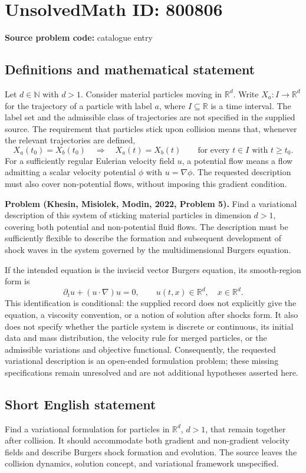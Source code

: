 \documentclass[11pt]{article}
\newcommand{\N}{\mathbb{N}}
\newcommand{\R}{\mathbb{R}}
\begin{document}
\section*{UnsolvedMath ID: 800806}
\textbf{Source problem code:} catalogue entry
\subsection{Definitions and mathematical statement}
Let \(d\in\N\) with \(d>1\). Consider material particles moving in \(\R^d\). Write \(X_a:I\to\R^d\) for the trajectory of a particle with label \(a\), where \(I\subseteq\R\) is a time interval. The label set and the admissible class of trajectories are not specified in the supplied source. The requirement that particles stick upon collision means that, whenever the relevant trajectories are defined,
\[
X_a(t_0)=X_b(t_0)
\quad\Longrightarrow\quad
X_a(t)=X_b(t)
\qquad\text{for every }t\in I\text{ with }t\geq t_0.
\]
For a sufficiently regular Eulerian velocity field \(u\), a potential flow means a flow admitting a scalar velocity potential \(\phi\) with \(u=\nabla\phi\). The requested description must also cover non-potential flows, without imposing this gradient condition.

\textbf{Problem (Khesin, Misiolek, Modin, 2022, Problem 5).} Find a variational description of this system of sticking material particles in dimension \(d>1\), covering both potential and non-potential fluid flows. The description must be sufficiently flexible to describe the formation and subsequent development of shock waves in the system governed by the multidimensional Burgers equation.

If the intended equation is the inviscid vector Burgers equation, its smooth-region form is
\[
\partial_t u+(u\cdot\nabla)u=0,
\qquad u(t,x)\in\R^d,\quad x\in\R^d.
\]
This identification is conditional: the supplied record does not explicitly give the equation, a viscosity convention, or a notion of solution after shocks form. It also does not specify whether the particle system is discrete or continuous, its initial data and mass distribution, the velocity rule for merged particles, or the admissible variations and objective functional. Consequently, the requested variational description is an open-ended formulation problem; these missing specifications remain unresolved and are not additional hypotheses asserted here.
\subsection{Short English statement}
Find a variational formulation for particles in \(\R^d\), \(d>1\), that remain together after collision. It should accommodate both gradient and non-gradient velocity fields and describe Burgers shock formation and evolution. The source leaves the collision dynamics, solution concept, and variational framework unspecified.
\end{document}
